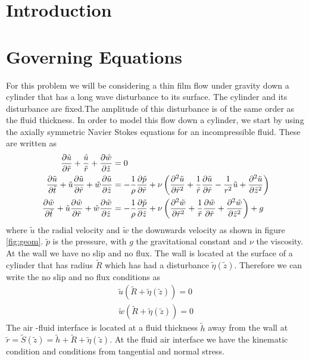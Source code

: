 \documentclass{jfm}
\begin{document}
	
	\section{Introduction} \label{sec:1}
	
\section{Governing Equations} \label{sec:2} 
For this problem we will be considering a thin film flow under gravity down a cylinder that has a long wave disturbance to its surface. The cylinder and its disturbance are fixed.The amplitude of this disturbance is of the same order as the fluid thickness. In order to model this flow down a cylinder, we start by using the axially symmetric Navier Stokes equations for an incompressible fluid. These are written as
\begin{align}
	\pdv{\tilde u}{\tilde r}+\frac{\tilde u}{\tilde r}+\pdv{\tilde w}{\tilde z}&=0\label{continuity}\\
	\pdv{\tilde u}{\tilde t}+\tilde u\pdv{\tilde u}{\tilde r}+\tilde w\pdv{\tilde u}{\tilde z}&=-\frac{1}{\rho}\pdv{\tilde p}{\tilde r}+\nu\left(\pdv[2]{\tilde u}{\tilde r}+\frac{1}{\tilde r}\pdv{\tilde u}{\tilde r}-\frac{1}{r^2}\tilde u+\pdv[2]{\tilde u}{\tilde z}\right)\\
	\pdv{\tilde w}{\tilde t}+\tilde u\pdv{\tilde w}{\tilde r}+\tilde w\pdv{\tilde w}{\tilde z}&=-\frac{1}{\rho}\pdv{\tilde p}{\tilde z}+\nu\left(\pdv[2]{\tilde w}{\tilde r}+\frac{1}{\tilde r}\pdv{\tilde w}{\tilde r}+\pdv[2]{\tilde w}{\tilde z}\right) + g 
\end{align}
where $\tilde u$ the radial velocity and $\tilde w$ the downwards velocity as shown in figure \ref{fig:geom}. $\tilde p$ is the pressure, with $g$ the gravitational constant and $\nu$ the viscosity. At the wall we have no slip and no flux. The wall is located at the surface of a cylinder that has radius $\tilde{R}$ which has had a disturbance $\tilde{\eta}(\tilde{z})$. Therefore we can write the no slip and no flux conditions as
\begin{align}
\tilde{u}(\tilde{R} + \tilde{\eta}(\tilde{z})) = 0\\
\tilde{w}(\tilde{R} + \tilde{\eta}(\tilde{z})) = 0
\end{align}
The air -fluid interface is located at a fluid thickness $\tilde{h}$ away from the wall at $\tilde r = \tilde S(\tilde z) = \tilde{h}+\tilde{R} + \tilde{\eta}(\tilde{z})$. At the fluid air interface we have the kinematic condition and conditions from tangential and normal stress.
\end{document}
